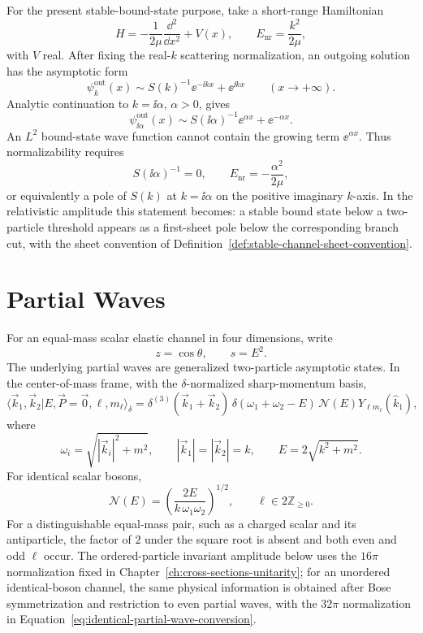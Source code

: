 For the present stable-bound-state purpose, take a short-range Hamiltonian
\[
  H=-\frac{1}{2\mu}\frac{\dd^2}{\dd x^2}+V(x),
  \qquad
  E_{\mathrm{nr}}=\frac{k^2}{2\mu},
\]
with \(V\) real.  After fixing the real-\(k\) scattering normalization, an
outgoing solution has the asymptotic form
\[
  \psi_k^{\mathrm{out}}(x)
  \sim
  S(k)^{-1}\ee^{-\ii kx}+\ee^{\ii kx}
  \qquad (x\to+\infty).
\]
Analytic continuation to \(k=\ii\alpha\), \(\alpha>0\), gives
\[
  \psi_{\ii\alpha}^{\mathrm{out}}(x)
  \sim
  S(\ii\alpha)^{-1}\ee^{\alpha x}
  +
  \ee^{-\alpha x}.
\]
An \(L^2\) bound-state wave function cannot contain the growing term
\(\ee^{\alpha x}\).  Thus normalizability requires
\[
  S(\ii\alpha)^{-1}=0,
  \qquad
  E_{\mathrm{nr}}=-\frac{\alpha^2}{2\mu},
\]
or equivalently a pole of \(S(k)\) at \(k=\ii\alpha\) on the positive imaginary
\(k\)-axis.  In the relativistic amplitude this statement becomes: a stable
bound state below a two-particle threshold appears as a first-sheet pole below
the corresponding branch cut, with the sheet convention of
Definition~\ref{def:stable-channel-sheet-convention}.

\section{Partial Waves}

For an equal-mass scalar elastic channel in four dimensions, write
\[
  z=\cos\theta,
  \qquad
  s=E^2 .
\]
The underlying partial waves are generalized two-particle asymptotic states.
In the center-of-mass frame, with the \(\delta\)-normalized sharp-momentum
basis,
\[
  \langle \vec k_1,\vec k_2
  |E,\vec P=\vec0,\ell,m_\ell\rangle_\delta
  =
  \delta^{(3)}(\vec k_1+\vec k_2)\,
  \delta(\omega_1+\omega_2-E)\,
  \mathcal N(E)Y_{\ell m_\ell}(\widehat k_1),
\]
where
\[
  \omega_i=\sqrt{|\vec k_i|^2+m^2},
  \qquad
  |\vec k_1|=|\vec k_2|=k,
  \qquad
  E=2\sqrt{k^2+m^2}.
\]
For identical scalar bosons,
\[
  \mathcal N(E)
  =
  \left(\frac{2E}{k\,\omega_1\omega_2}\right)^{1/2},
  \qquad
  \ell\in2\mathbb Z_{\ge0}.
\]
For a distinguishable equal-mass pair, such as a charged scalar and its
antiparticle, the factor of \(2\) under the square root is absent and both
even and odd \(\ell\) occur. The ordered-particle invariant amplitude below
uses the \(16\pi\) normalization fixed in
Chapter~\ref{ch:cross-sections-unitarity}; for an unordered identical-boson
channel, the same physical information is obtained after Bose symmetrization
and restriction to even partial waves, with the \(32\pi\) normalization in
Equation~\eqref{eq:identical-partial-wave-conversion}.

